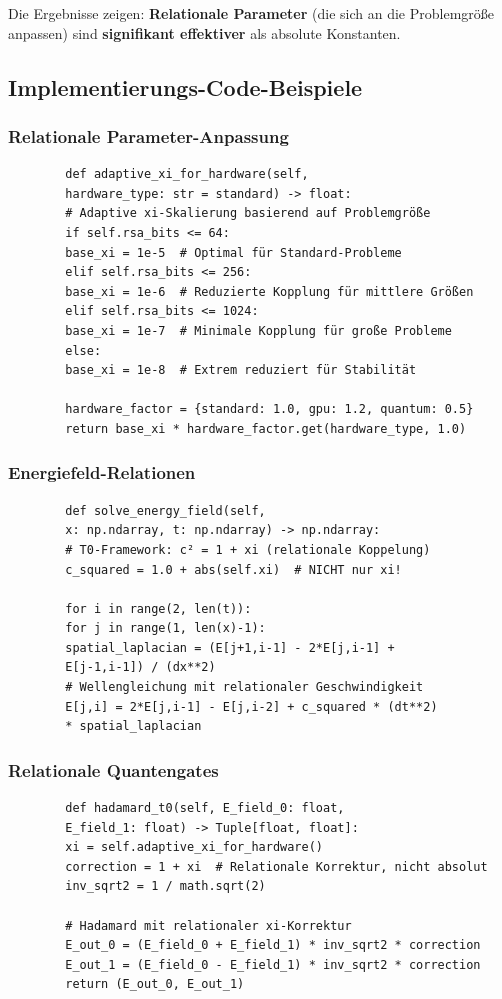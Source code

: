 	Die Ergebnisse zeigen: \textbf{Relationale Parameter} (die sich an die Problemgröße anpassen) sind \textbf{signifikant effektiver} als absolute Konstanten.
	
	\subsection{Implementierungs-Code-Beispiele}
	
	\subsubsection{Relationale Parameter-Anpassung}
	\begin{verbatim}
		def adaptive_xi_for_hardware(self,
		hardware_type: str = standard) -> float:
		# Adaptive xi-Skalierung basierend auf Problemgröße
		if self.rsa_bits <= 64:
		base_xi = 1e-5  # Optimal für Standard-Probleme
		elif self.rsa_bits <= 256:
		base_xi = 1e-6  # Reduzierte Kopplung für mittlere Größen
		elif self.rsa_bits <= 1024:
		base_xi = 1e-7  # Minimale Kopplung für große Probleme
		else:
		base_xi = 1e-8  # Extrem reduziert für Stabilität
		
		hardware_factor = {standard: 1.0, gpu: 1.2, quantum: 0.5}
		return base_xi * hardware_factor.get(hardware_type, 1.0)
	\end{verbatim}
	
	\subsubsection{Energiefeld-Relationen}
	\begin{verbatim}
		def solve_energy_field(self,
		x: np.ndarray, t: np.ndarray) -> np.ndarray:
		# T0-Framework: c² = 1 + xi (relationale Koppelung)
		c_squared = 1.0 + abs(self.xi)  # NICHT nur xi!
		
		for i in range(2, len(t)):
		for j in range(1, len(x)-1):
		spatial_laplacian = (E[j+1,i-1] - 2*E[j,i-1] + 
		E[j-1,i-1]) / (dx**2)
		# Wellengleichung mit relationaler Geschwindigkeit
		E[j,i] = 2*E[j,i-1] - E[j,i-2] + c_squared * (dt**2) 
		* spatial_laplacian
	\end{verbatim}
	
	\subsubsection{Relationale Quantengates}
	\begin{verbatim}
		def hadamard_t0(self, E_field_0: float,
		E_field_1: float) -> Tuple[float, float]:
		xi = self.adaptive_xi_for_hardware()
		correction = 1 + xi  # Relationale Korrektur, nicht absolut
		inv_sqrt2 = 1 / math.sqrt(2)
		
		# Hadamard mit relationaler xi-Korrektur
		E_out_0 = (E_field_0 + E_field_1) * inv_sqrt2 * correction
		E_out_1 = (E_field_0 - E_field_1) * inv_sqrt2 * correction
		return (E_out_0, E_out_1)
	\end{verbatim}
	
